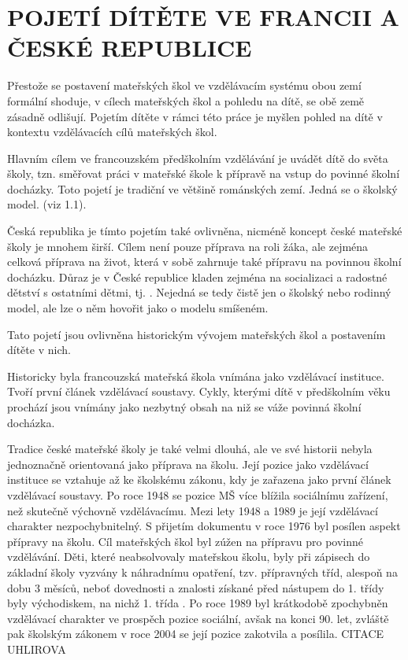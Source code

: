 \chapter{POJETÍ DÍTĚTE VE FRANCII A ČESKÉ REPUBLICE}

Přestože se postavení mateřských škol ve vzdělávacím systému obou zemí formální shoduje, v cílech mateřských škol a pohledu na dítě, se obě země zásadně odlišují. Pojetím dítěte v rámci této práce je myšlen pohled na dítě v kontextu vzdělávacích cílů mateřských škol. 

Hlavním cílem ve francouzském předškolním vzdělávání je uvádět dítě do světa školy, tzn. směřovat práci v mateřské škole k přípravě na vstup do povinné školní docházky. Toto pojetí je tradiční ve většině románských zemí. Jedná se o školský model. (viz 1.1).

 Česká republika je tímto pojetím také ovlivněna, nicméně koncept české mateřské školy je mnohem širší. Cílem není pouze příprava na roli žáka, ale zejména celková příprava na život, která v sobě zahrnuje také přípravu na povinnou školní docházku. Důraz je v České republice kladen zejména na socializaci a radostné dětství s ostatními dětmi, tj. . Nejedná se tedy čistě jen o školský nebo rodinný model, ale lze o něm hovořit jako o modelu smíšeném.

Tato pojetí jsou ovlivněna historickým vývojem mateřských škol a postavením dítěte v nich.

Historicky byla francouzská mateřská škola vnímána jako vzdělávací instituce. Tvoří první článek vzdělávací soustavy. Cykly, kterými dítě v předškolním věku prochází jsou vnímány jako nezbytný obsah na niž se váže povinná školní docházka. 

Tradice české mateřské školy je také velmi dlouhá, ale ve své historii nebyla jednoznačně orientovaná jako příprava na školu. Její pozice jako vzdělávací instituce se vztahuje až ke školskému zákonu, kdy je zařazena jako první článek vzdělávací soustavy. 
 Po roce 1948 se pozice MŠ více blížila sociálnímu zařízení, než skutečně výchovně vzdělávacímu. Mezi lety 1948 a 1989 je její vzdělávací charakter nezpochybnitelný. S přijetím dokumentu  v roce 1976 byl posílen aspekt přípravy na školu. Cíl mateřských škol byl zúžen na přípravu pro povinné vzdělávání. Děti, které neabsolvovaly mateřskou školu, byly při zápisech do základní školy vyzvány k náhradnímu opatření, tzv. přípravných tříd, alespoň na dobu 3 měsíců, neboť dovednosti a znalosti získané před nástupem do 1. třídy byly východiskem, na nichž 1. třída . Po roce 1989 byl krátkodobě zpochybněn vzdělávací charakter ve prospěch pozice sociální, avšak na konci 90. let, zvláště pak školským zákonem v roce 2004 se její pozice zakotvila a posílila. CITACE UHLIROVA

